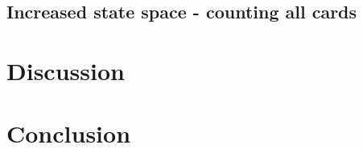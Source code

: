 \documentclass[conference]{IEEEtran}
\begin{document}
\subsection{Increased state space - counting all cards}

\section{Discussion}


\section{Conclusion}



\end{document}
